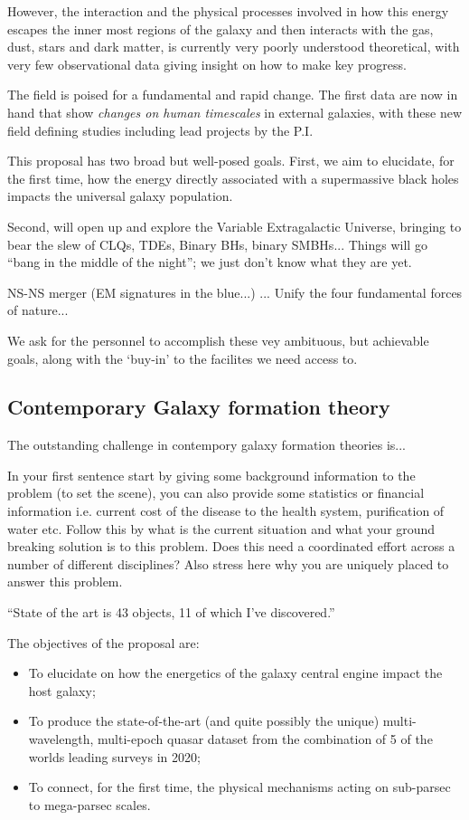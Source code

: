 \documentclass[oneside, a4paper, onecolumn, 11pt]{article}
\begin{document}
However, the interaction and the physical processes involved in how
this energy escapes the inner most regions of the galaxy and then
interacts with the gas, dust, stars and dark matter, is currently very
poorly understood theoretical, with very few observational data giving
insight on how to make key progress.

The field is poised for a fundamental and rapid change. The first data are now in hand 
that show {\it changes on human timescales} in external galaxies, with these new 
field defining studies including lead projects by the P.I. 

This proposal has two broad but well-posed goals. 
First, we aim to elucidate, for the first time, how the energy directly associated with a 
supermassive black holes impacts the universal galaxy population.  

Second, will open up and explore the Variable Extragalactic Universe, bringing to bear 
the slew of 
CLQs, TDEs, Binary BHs, binary SMBHs... 
Things will go ``bang in the middle of the night''; we just don't know what 
they are yet. 

NS-NS merger (EM signatures in the blue...) ...
Unify the four fundamental forces of nature...


We ask for the personnel to accomplish these vey ambituous, 
but achievable goals, along with the `buy-in' to the facilites we need access to. 






\subsection{Contemporary Galaxy formation theory}
The outstanding challenge in contempory galaxy formation theories is...

In your first sentence start by giving some background information to the problem (to set the scene), you can also provide some statistics or financial information i.e. current cost of the disease to the health system, purification of water etc. Follow this by what is the current situation and what your ground breaking solution is to this problem. Does this need a coordinated effort across a number of different disciplines? Also stress here why you are uniquely placed to answer this problem.

``State of the art is 43 objects, 11 of which I've discovered.''

The objectives of the proposal are:
\begin{itemize}
\item To elucidate on how the energetics of the galaxy central engine impact the host galaxy;
\item To produce the state-of-the-art (and quite possibly the unique) multi-wavelength, multi-epoch 
quasar dataset from the combination of 5 of the worlds leading surveys in 2020; 
\item To connect, for the first time, the physical mechanisms acting on sub-parsec to mega-parsec scales. 
\end{itemize}
\end{document}
